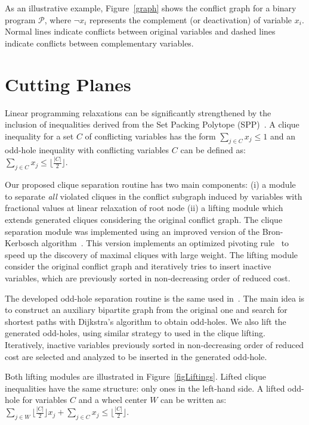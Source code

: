 \documentclass{endm}
\begin{document}
As an illustrative example, Figure~\ref{graph} shows the conflict graph for a binary program $\mathcal{P}$, where $\neg x_i$ represents the complement (or deactivation) of variable $x_i$. Normal lines indicate conflicts between original variables and dashed lines indicate conflicts between complementary variables.

\section{Cutting Planes}\label{cut}

Linear programming relaxations can be significantly strengthened by the inclusion of inequalities derived from the Set Packing Polytope (SPP)~\cite{Padberg1973,Rebennack2009}. A clique inequality for a set $C$ of conflicting variables has the form $\sum_{j\in C}x_{j} \leq 1$ and an odd-hole inequality with conflicting variables $C$ can be defined as: $\sum_{j\in C}x_{j} \leq \lfloor \frac{|C|}{2}\rfloor$.

Our proposed clique separation routine has two main components: (i) a module to separate \emph{all} violated cliques in the conflict subgraph induced by variables with fractional values at linear relaxation of root node (ii) a lifting module which extends generated cliques considering the original conflict graph. The clique separation module was implemented using an improved version of the Bron-Kerbosch algorithm~\cite{Bron1973}. This version implements an optimized pivoting rule~\cite{Brito2011} to speed up the discovery of maximal cliques with large weight. The lifting module consider the original conflict graph and iteratively tries to insert inactive variables, which are previously sorted in non-decreasing order of reduced cost.

The developed odd-hole separation routine is the same used in~\cite{Rebennack2009}. The main idea is to construct an auxiliary bipartite graph from the original one and search for shortest paths with Dijkstra's algorithm to obtain odd-holes. We also lift the generated odd-holes, using similar strategy to used in the clique lifting. Iteratively, inactive variables previously sorted in non-decreasing order of reduced cost are selected and analyzed to be inserted in the generated odd-hole.

Both lifting modules are illustrated in Figure~\ref{figLiftings}. Lifted clique inequalities have the same structure: only ones in the left-hand side. A lifted odd-hole for variables $C$ and a wheel center $W$ can be written as: $\displaystyle \sum_{j \in W} \lfloor \frac{|C|}{2} \rfloor x_{j} + \sum_{j \in C} x_{j} \leq \lfloor \frac{|C|}{2} \rfloor$.
\end{document}
